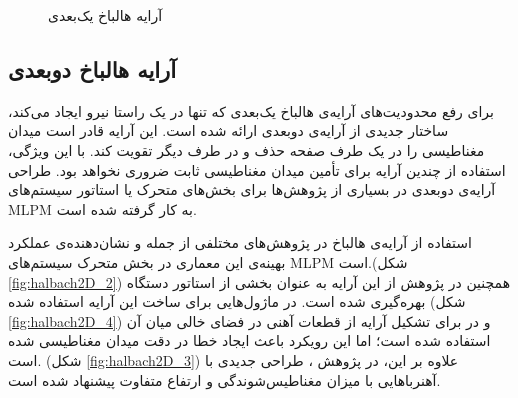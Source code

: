 \begin{figure}[ht]
\centering 
{}
%
\caption{آرایه هالباخ یک‌بعدی}
\label{fig:halbach1D} %
\end{figure}

\subsection{آرایه هالباخ دوبعدی}

برای رفع محدودیت‌های آرایه‌ی هالباخ یک‌بعدی که تنها در یک راستا نیرو ایجاد می‌کند، ساختار جدیدی از آرایه‌ی دوبعدی ارائه شده است. این آرایه قادر است میدان مغناطیسی را در یک طرف صفحه حذف و در طرف دیگر تقویت کند. با این ویژگی، استفاده از چندین آرایه برای تأمین میدان مغناطیسی ثابت ضروری نخواهد بود. طراحی آرایه‌ی دوبعدی در بسیاری از پژوهش‌ها برای بخش‌های متحرک یا استاتور سیستم‌های MLPM به کار گرفته شده است.

استفاده از آرایه‌ی هالباخ در پژوهش‌های مختلفی از جمله
\cite{RN10, RN30} 
و
\cite{RN55, RN26} 
نشان‌دهنده‌ی عملکرد بهینه‌ی این معماری در بخش متحرک سیستم‌های MLPM است.(شکل
\ref{fig:halbach2D_2})
 همچنین در پژوهش
\cite{RN14}
 از این آرایه به عنوان بخشی از استاتور دستگاه بهره‌گیری شده است. در 
\cite{RN61}
 ماژول‌هایی برای ساخت این آرایه استفاده شده (شکل
\ref{fig:halbach2D_4})
 و در
\cite{RN49}
 برای تشکیل آرایه از قطعات آهنی در فضای خالی میان آن استفاده شده است؛ اما این رویکرد باعث ایجاد خطا در دقت میدان مغناطیسی شده است. (شکل
\ref{fig:halbach2D_3})
علاوه بر این، در پژوهش
\cite{RN28}
، طراحی جدیدی با آهنرباهایی با میزان مغناطیس‌شوندگی و ارتفاع متفاوت پیشنهاد شده است.

